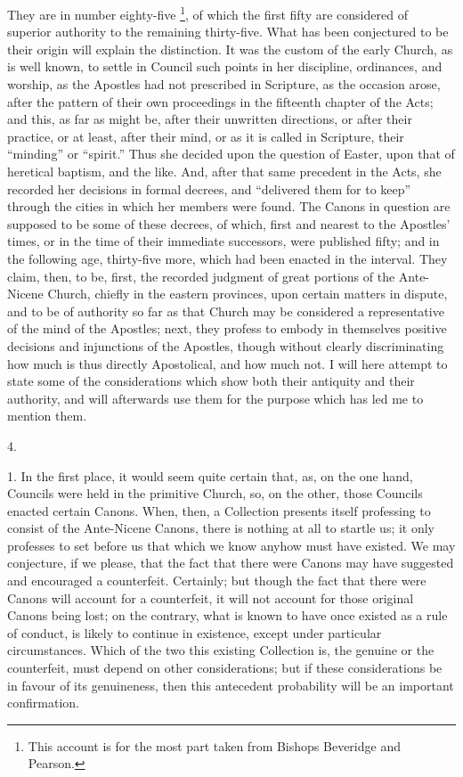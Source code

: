 They are in number eighty-five \footnote{This account is for the most part taken from Bishops Beveridge
and Pearson.}, of which the first fifty are considered of superior authority
to the remaining thirty-five. What has been conjectured to be their
origin will explain the distinction. It was the custom of the early
Church, as is well known, to settle in Council such points in her
discipline, ordinances, and worship, as the Apostles had not
prescribed in Scripture, as the occasion arose, after the pattern of
their own proceedings in the fifteenth chapter of the Acts; and this,
as far as might be, after their unwritten directions, or after their
practice, or at least, after their mind, or as it is called in
Scripture, their ``minding'' or ``spirit.'' Thus she
decided upon the question of Easter, upon that of heretical baptism,
and the like. And, after that same precedent in the Acts, she recorded
her decisions in formal decrees, and ``delivered them for to
keep'' through the cities in which her members were found. The
Canons in question are supposed to be some of these decrees, of which,
first and nearest to the Apostles' times, or in the time of their
immediate successors, were published fifty; and in the following age,
thirty-five more, which had been enacted in the interval. They claim,
then, to be, first, the recorded judgment of great portions of
the Ante-Nicene Church, chiefly in the eastern provinces, upon certain
matters in dispute, and to be of authority so far as that Church may
be considered a representative of the mind of the Apostles; next, they
profess to embody in themselves positive decisions and injunctions of
the Apostles, though without clearly discriminating how much is thus
directly Apostolical, and how much not. I will here attempt to state
some of the considerations which show both their antiquity and their
authority, and will afterwards use them for the purpose which has led
me to mention them.

4.

1. In the first place, it would seem quite certain that, as, on the
one hand, Councils were held in the primitive Church, so, on the
other, those Councils enacted certain Canons. When, then, a Collection
presents itself professing to consist of the Ante-Nicene Canons, there
is nothing at all to startle us; it only professes to set before us
that which we know anyhow must have existed. We may conjecture, if we
please, that the fact that there were Canons may have suggested and
encouraged a counterfeit. Certainly; but though the fact that there
were Canons will account for a counterfeit, it will not account for
those original Canons being lost; on the contrary, what is known to
have once existed as a rule of conduct, is likely to continue in
existence, except under particular circumstances. Which of the two
this existing Collection is, the genuine or the counterfeit, must
depend on other considerations; but if these considerations be in
favour of its genuineness, then this antecedent probability will be an
important confirmation.

